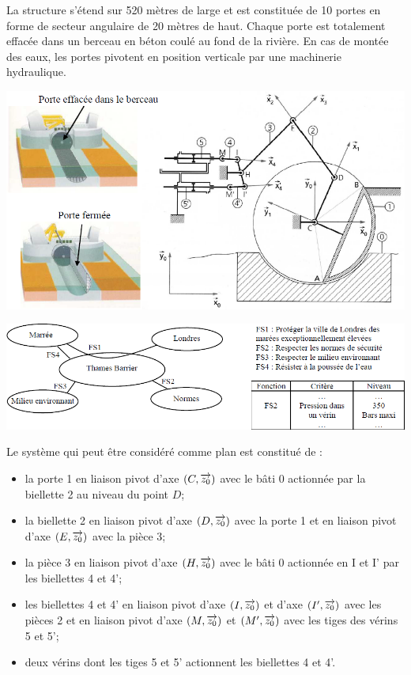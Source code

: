 \documentclass[10pt]{article}
\begin{document}
La structure s'étend sur 520 mètres de large et est constituée de 10 portes en forme de secteur angulaire de 20 mètres de haut. Chaque porte est totalement effacée dans un berceau en béton coulé au fond de la rivière. En cas de montée des eaux, les portes pivotent en position verticale par une machinerie hydraulique. 

\begin{center}
\includegraphics[width=.9\textwidth]{images/img4.png}
\end{center}

\begin{center}
\includegraphics[width=.9\textwidth]{images/img5.png}
\end{center}

Le système qui peut être considéré comme plan est constitué de : 
\begin{itemize}
\item la porte 1 en liaison pivot d'axe $(C,\overrightarrow{z_0})$ avec le bâti 0 actionnée par la biellette 2 au niveau du point $D$;
\item la biellette 2 en liaison pivot d'axe $(D,\overrightarrow{z_0})$ avec la porte 1 et en liaison pivot d'axe $(E,\overrightarrow{z_0})$ avec la pièce 3;
\item la pièce 3 en liaison pivot d'axe $(H,\overrightarrow{z_0})$ avec le bâti 0 actionnée en I et I' par les biellettes 4 et 4';
\item les biellettes 4 et 4' en liaison pivot d'axe $(I,\overrightarrow{z_0})$ et d'axe $(I',\overrightarrow{z_0})$ avec les pièces 2 et en liaison pivot d'axe $(M,\overrightarrow{z_0})$ et $(M',\overrightarrow{z_0})$ avec les tiges des vérins 5 et 5';
\item deux vérins dont les tiges 5 et 5' actionnent les biellettes 4 et 4'. 
\end{itemize}
\end{document}
